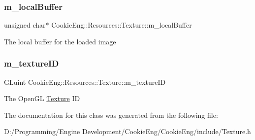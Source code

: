 \subsubsection{\texorpdfstring{m\+\_\+local\+Buffer}{m\_localBuffer}}
{\footnotesize\ttfamily unsigned char$\ast$ Cookie\+Eng\+::\+Resources\+::\+Texture\+::m\+\_\+local\+Buffer\hspace{0.3cm}{\ttfamily [protected]}}

The local buffer for the loaded image \mbox{\label{class_cookie_eng_1_1_resources_1_1_texture_af0b6161b941846749407ba504e68ef5a}} 
\subsubsection{\texorpdfstring{m\+\_\+texture\+ID}{m\_textureID}}
{\footnotesize\ttfamily G\+Luint Cookie\+Eng\+::\+Resources\+::\+Texture\+::m\+\_\+texture\+ID\hspace{0.3cm}{\ttfamily [protected]}}

The Open\+GL \hyperlink{class_cookie_eng_1_1_resources_1_1_texture}{Texture} ID 

The documentation for this class was generated from the following file\+:\begin{DoxyCompactItemize}
\item 
D\+:/\+Programming/\+Engine Development/\+Cookie\+Eng/\+Cookie\+Eng/include/Texture.\+h\end{DoxyCompactItemize}
